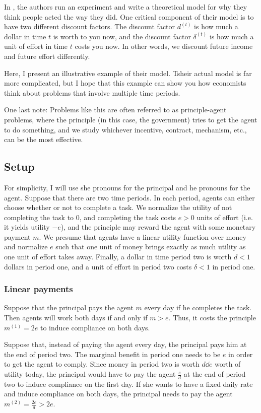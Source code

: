 In \citet{timestuff}, the authors run an experiment and write a theoretical model for why they think people acted the way they did. One critical component of their model is to have two different discount factors. The discount factor $d^{(t)}$ is how much a dollar in time $t$ is worth to you now, and the discount factor $\delta^{(t)}$ is how much a unit of effort in time $t$ costs you now. In other words, we discount future income and future effort differently. 

Here, I present an illustrative example of their model. Tsheir actual model is far more complicated, but I hope that this example can show you how economists think about problems that involve multiple time periods. 

One last note: Problems like this are often referred to as principle-agent problems, where the principle (in this case, the government) tries to get the agent to do something, and we study whichever incentive, contract, mechanism, etc., can be the most effective. 

\subsection*{Setup}
For simplicity, I will use she pronouns for the principal and he pronouns for the agent. Suppose that there are two time periods. In each period, agents can either choose whether or not to complete a task. We normalize the utility of not completing the task to $0$, and completing the task costs $e > 0$ units of effort (i.e. it yields utility $-e$), and the principle may reward the agent with some monetary payment $m$. We presume that agents have a linear utility function over money and normalize $e$ such that one unit of money brings exactly as much utility as one unit of effort takes away. Finally, a dollar in time period two is worth $d < 1$ dollars in period one, and a unit of effort in period two costs $\delta < 1$ in period one.
\subsubsection*{Linear payments}
Suppose that the principal pays the agent $m$ every day if he completes the task. Then agents will work both days if and only if $m > e$. Thus, it costs the principle $m^{(1)} = 2e$ to induce compliance on both days.

Suppose that, instead of paying the agent every day, the principal pays him at the end of period two. The marginal benefit in period one needs to be $e$ in order to get the agent to comply. Since money in period two is worth $d \dd e$ worth of utility today, the principal would have to pay the agent $\frac{e}{d}$ at the end of period two to induce compliance on the first day. If she wants to have a fixed daily rate and induce compliance on both days, the principal needs to pay the agent $m^{(2)} =\frac{2e}{d} > 2e$. 

